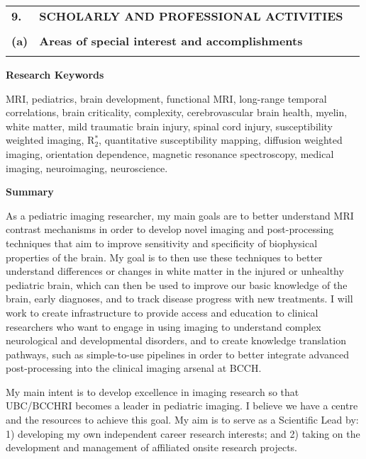\documentclass[11pt,notitlepage,english]{report}
\begin{document}
\begin{tabular}{L{.5cm} L{12cm} L{6.9cm}}
  \textbf{9.}  & \textbf{SCHOLARLY AND PROFESSIONAL ACTIVITIES}                                      \\
  \\
  \textbf{(a)} & \textbf{Areas of special interest and accomplishments} \\
  \\
\end{tabular}
\label{9. Scholarly and Professional Activities}

\noindent \textbf{Research Keywords}

\noindent MRI, pediatrics, brain development, functional MRI, long-range temporal correlations, brain criticality, complexity, cerebrovascular brain health, myelin, white matter, mild traumatic brain injury, spinal cord injury, susceptibility weighted imaging, R$_{2}^{*}$, quantitative susceptibility mapping, diffusion weighted imaging, orientation dependence, magnetic resonance spectroscopy, medical imaging, neuroimaging, neuroscience.

\vspace{5pt}

\noindent \textbf{Summary}


As a pediatric imaging researcher, my main goals are to better understand MRI contrast mechanisms in order to develop novel imaging and post-processing techniques that aim to improve sensitivity and specificity of biophysical properties of the brain. My goal is to then use these techniques to better understand differences or changes in white matter in the injured or unhealthy pediatric brain, which can then be used to improve our basic knowledge of the brain, early diagnoses, and to track disease progress with new treatments. I will work to create infrastructure to provide access and education to clinical researchers who want to engage in using imaging to understand complex neurological and developmental disorders, and to create knowledge translation pathways, such as simple-to-use pipelines in order to better integrate advanced post-processing into the clinical imaging arsenal at BCCH.

My main intent is to develop excellence in imaging research so that UBC/BCCHRI becomes a leader in pediatric imaging. I believe we have a centre and the resources to achieve this goal. My aim is to serve as a Scientific Lead by: 1) developing my own independent career research interests; and 2) taking on the development and management of affiliated onsite research projects.
\end{document}
